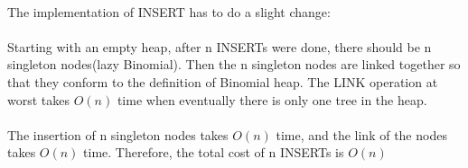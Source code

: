 \begin{problem}{2} ~\\
The implementation of INSERT has to do a slight change:\\
\\
Starting with an empty heap, after n INSERTs were done, there should be n singleton nodes(lazy Binomial). Then the n singleton nodes are linked together so that they conform to the definition of Binomial heap. The LINK operation at worst takes $O(n)$ time when eventually there is only one tree in the heap.\\
\\
The insertion of n singleton nodes takes $O(n)$ time, and the link of the nodes takes $O(n)$ time. Therefore, the total cost of n INSERTs is $O(n)$
\end{problem}